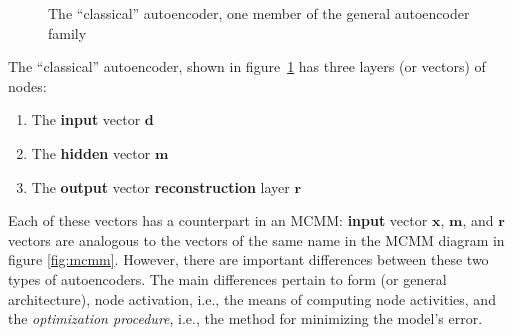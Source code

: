 \begin{figure}[tb]
\begin{center}
\end{center}
\caption{The ``classical'' autoencoder, one member of the general autoencoder family}
\label{fig:autoencoder}
\end{figure}

 The ``classical'' autoencoder,
shown in figure~\ref{fig:autoencoder} has three layers (or vectors) of nodes:
\begin{enumerate}
\item The \textbf{input} vector $\textbf{d}$
\item The \textbf{hidden} vector $\textbf{m}$
\item The \textbf{output} vector \textbf{reconstruction} layer $\textbf{r}$ 
\end{enumerate}

 Each of these vectors has a counterpart in an MCMM: \textbf{input} vector $\textbf{x}$, $\textbf{m}$, and $\textbf{r}$ vectors are analogous to the vectors of the same name in the MCMM diagram in figure \ref{fig:mcmm}.
However, there are important differences between these two types of autoencoders. The main differences pertain to form (or general architecture), node activation, i.e., the means of computing node activities, and the \emph{optimization procedure}, i.e., the method for minimizing the model's error.

